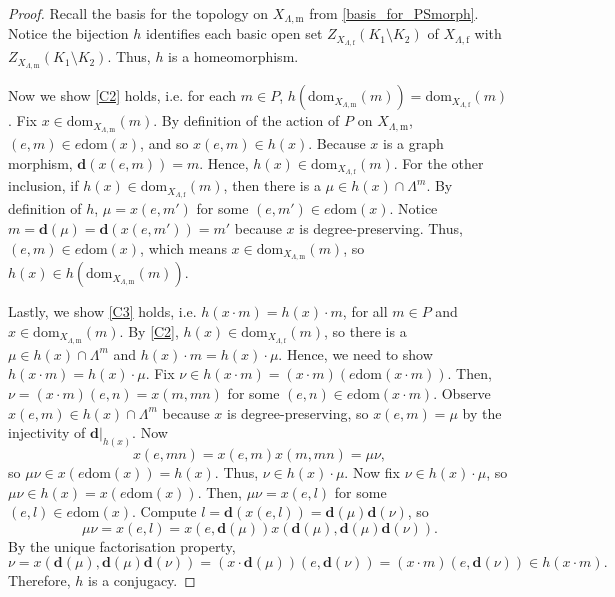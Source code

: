 \documentclass[11pt]{amsart}
\theoremstyle{definition}
\numberwithin{thm}{section}
\numberwithin{equation}{section}
\newcommand{\degree}{\mathbf{d}}
\newcommand{\morphdom}[1]{\mathrm{dom}(#1)}
\newcommand{\PSfiltershiftoff}[2]{#2 \cdot #1}
\newcommand{\M}{\mathrm{m}}
\newcommand{\F}{\mathrm{f}}
\newcommand{\PS}[2]{X_{#2, #1}}
\newcommand{\RPA}[2]{#1 \cdot #2}
\newcommand{\RPAdom}[2]{\textrm{dom}_{#1}(#2)}
\newcommand{\Fell}[3]{Z_{#1}\left(#2 \setminus #3\right)}
\begin{document}
\begin{proof}
Recall the basis for the topology on $\PS{\M}{\Lambda}$ from \cref{basis_for_PSmorph}.
Notice the bijection $h$ identifies each basic open set $\Fell{\PS{\F}{\Lambda}}{K_1}{K_2}$ of $\PS{\F}{\Lambda}$ with $\Fell{\PS{\M}{\Lambda}}{K_1}{K_2}$. 
Thus, $h$ is a homeomorphism.

Now we show \ref{C2} holds, i.e. for each $m \in P$, $h(\RPAdom{\PS{\M}{\Lambda}}{m}) = \RPAdom{\PS{\F}{\Lambda}}{m}$.
Fix $x \in \RPAdom{\PS{\M}{\Lambda}}{m}$. 
By definition of the action of $P$ on $\PS{\M}{\Lambda}$, $(e, m) \in e\morphdom{x}$, and so $x(e, m) \in h(x)$. 
Because $x$ is a graph morphism, $\degree(x(e, m)) = m$. 
Hence, $h(x) \in \RPAdom{\PS{\F}{\Lambda}}{m}$.
For the other inclusion, if $h(x) \in \RPAdom{\PS{\F}{\Lambda}}{m}$, then there is a $\mu \in h(x) \cap \Lambda^m$. 
By definition of $h$, $\mu = x(e, m')$ for some $(e, m') \in e\morphdom{x}$. 
Notice $m = \degree(\mu) = \degree(x(e, m')) = m'$ because $x$ is degree-preserving.
Thus, $(e, m) \in e\morphdom{x}$, which means $x \in \RPAdom{\PS{\M}{\Lambda}}{m}$, so $h(x) \in h(\RPAdom{\PS{\M}{\Lambda}}{m})$.

Lastly, we show \ref{C3} holds, i.e. $h(\RPA{x}{m}) = \RPA{h(x)}{m}$, for all $m \in P$ and $x \in \RPAdom{\PS{\M}{\Lambda}}{m}$.
By \ref{C2}, $h(x) \in \RPAdom{\PS{\F}{\Lambda}}{m}$, so there is a $\mu \in h(x) \cap \Lambda^m$ and $\RPA{h(x)}{m} = \PSfiltershiftoff{\mu}{h(x)}$. 
Hence, we need to show $h(\RPA{x}{m}) = \PSfiltershiftoff{\mu}{h(x)}$. 
Fix $\nu \in h(\RPA{x}{m}) = (\RPA{x}{m})(e\morphdom{\RPA{x}{m}})$. 
Then, $\nu = (\RPA{x}{m})(e, n) = x(m, mn)$ for some $(e, n) \in e\morphdom{\RPA{x}{m}}$. 
Observe $x(e, m) \in h(x) \cap \Lambda^m$ because $x$ is degree-preserving, so $x(e, m) = \mu$ by the injectivity of $\degree|_{h(x)}$. 
Now 
\[
x(e, mn) 
= x(e, m)x(m, mn) 
= \mu\nu,
\] 
so $\mu\nu \in x(e\morphdom{x}) = h(x)$. 
Thus, $\nu \in \PSfiltershiftoff{\mu}{h(x)}$.
Now fix $\nu \in \PSfiltershiftoff{\mu}{h(x)}$, so $\mu\nu \in h(x) = x(e\morphdom{x})$. 
Then, $\mu\nu = x(e, l)$ for some $(e, l) \in e\morphdom{x}$. 
Compute $l = \degree(x(e, l)) = \degree(\mu)\degree(\nu)$, so 
\[
\mu\nu 
= x(e, l) 
= x(e, \degree(\mu))x(\degree(\mu), \degree(\mu)\degree(\nu)).
\] 
By the unique factorisation property, 
\[
\nu 
= x(\degree(\mu), \degree(\mu)\degree(\nu)) 
= (\RPA{x}{\degree(\mu)})(e, \degree(\nu)) 
= (\RPA{x}{m})(e, \degree(\nu)) 
\in h(\RPA{x}{m}).
\]
Therefore, $h$ is a conjugacy.
\end{proof}
\end{document}
